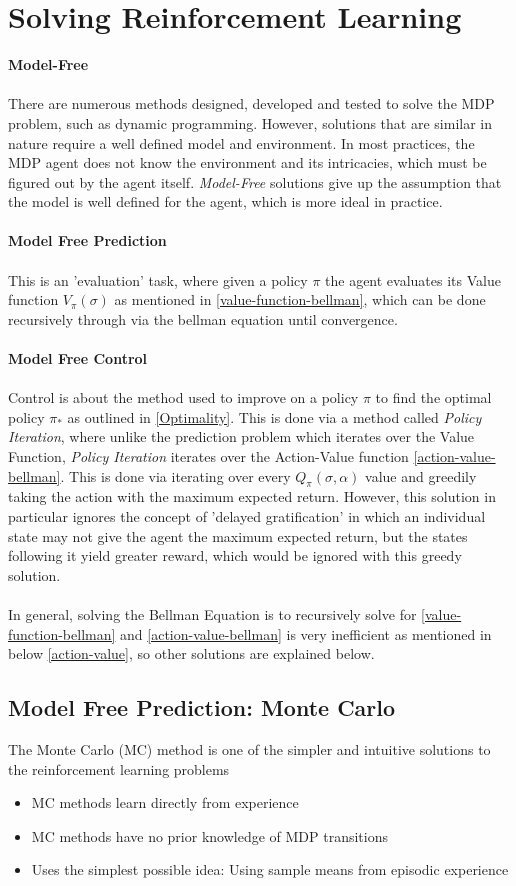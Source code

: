 \documentclass[ %
                    author={Ashwinder Khurana},
                supervisor={Prof Dave Cliff},
                    degree={MEng},
                     title={The Deeply Reinforced Trader},
                  subtitle={},
                      type={enterprise},
                      year={2020} ]{dissertation}
\begin{document}
{\section{Solving Reinforcement Learning}
\textbf{Model-Free}
\\
\\
There are numerous methods designed, developed and tested to solve the MDP problem, such as dynamic programming. However, solutions that are similar in nature require a well defined model and environment. In most practices, the MDP agent does not know the environment and its intricacies, which must be figured out by the agent itself. \textit{Model-Free} solutions give up the assumption that the model is well defined for the agent, which is more ideal in practice.
\\
\\
\textbf{Model Free Prediction} 
\\
\\
This is an 'evaluation' task, where given a policy $\pi$ the agent evaluates its Value function $V_\pi(\sigma)$ as mentioned in \ref{value-function-bellman}, which can be done recursively through via the bellman equation until convergence. 
\\
\\
\textbf{Model Free Control}
\\
\\
\noindent
Control is about the method used to improve on a policy $\pi$ to find the optimal policy $\pi_*$ as outlined in \ref{Optimality}. This is done via a method called \textit{Policy Iteration}, where unlike the prediction problem which iterates over the Value Function, \textit{Policy Iteration} iterates over the Action-Value function \ref{action-value-bellman}. This is done via iterating over every $Q_\pi(\sigma, \alpha)$ value and greedily taking the action with the maximum expected return. However, this solution in particular ignores the concept of 'delayed gratification' in which an individual state may not give the agent the maximum expected return, but the states following it yield greater reward, which would be ignored with this greedy solution. 
\\
\\
\noindent
In general, solving the Bellman Equation is to recursively solve for \ref{value-function-bellman} and \ref{action-value-bellman} is very inefficient as mentioned in below \ref{action-value}, so other solutions are explained below. 

\subsection{Model Free Prediction: Monte Carlo }
\label{Monte Carlo Prediction}
The Monte Carlo (MC) method is one of the simpler and intuitive solutions to the reinforcement learning problems
\begin{itemize}
\item MC methods learn directly from experience
\item MC methods have no prior knowledge of MDP transitions 
\item Uses the simplest possible idea: Using sample means from episodic experience 
\end{itemize}

}
\end{document}
